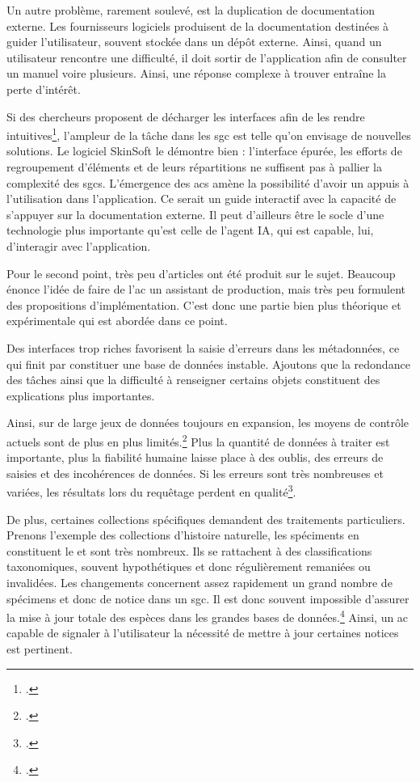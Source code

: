 Un autre problème, rarement soulevé, est la duplication de documentation externe. Les fournisseurs logiciels produisent de la documentation destinées à guider l'utilisateur, souvent stockée dans un dépôt externe. Ainsi, quand un utilisateur rencontre une difficulté, il doit sortir de l'application afin de consulter un manuel voire plusieurs. Ainsi, une réponse complexe à trouver entraîne la perte d'intérêt.
	
Si des chercheurs proposent de décharger les interfaces afin de les rendre intuitives\footcite{whitelawGenerousInterfacesDigital2015}, l'ampleur de la tâche dans les \gls{sgc} est telle qu'on envisage de nouvelles solutions. Le logiciel SkinSoft le démontre bien : l'interface épurée, les efforts de regroupement d'éléments et de leurs répartitions ne suffisent pas à pallier la complexité des \glspl{sgc}. L'émergence des \glspl{ac} amène la possibilité d'avoir un appuis à l'utilisation dans l'application. Ce serait un guide interactif avec la capacité de s'appuyer sur la documentation externe. Il peut d'ailleurs être le socle d'une technologie plus importante qu'est celle de l'agent IA, qui est capable, lui, d'interagir avec l'application.\newline
	
Pour le second point, très peu d'articles ont été produit sur le sujet. Beaucoup énonce l'idée de faire de l'\gls{ac} un assistant de production, mais très peu formulent des propositions d'implémentation. C'est donc une partie bien plus théorique et expérimentale qui est abordée dans ce point. 

Des interfaces trop riches favorisent la saisie d'erreurs dans les métadonnées, ce qui finit par constituer une base de données instable. Ajoutons que la redondance des tâches ainsi que la difficulté à renseigner certains objets constituent des explications plus importantes. 

Ainsi, sur de large jeux de données toujours en expansion, les moyens de contrôle actuels sont de plus en plus limités.\footcite[p.2]{lewisImpactHumanDecisionMaking2025} Plus la quantité de données à traiter est importante, plus la fiabilité humaine laisse place à des oublis, des erreurs de saisies et des incohérences de données. Si les erreurs sont très nombreuses et variées, les résultats lors du requêtage perdent en qualité\footcite[p.4]{lewisImpactHumanDecisionMaking2025}.
	
De plus, certaines collections spécifiques demandent des traitements particuliers. Prenons l'exemple des collections d'histoire naturelle, les spéciments en constituent le \coeur et sont très nombreux. Ils se rattachent à des classifications taxonomiques, souvent hypothétiques et donc régulièrement remaniées ou invalidées. Les changements concernent assez rapidement un grand nombre de spécimens et donc de notice dans un \gls{sgc}. Il est donc souvent impossible d'assurer la mise à jour totale des espèces dans les grandes bases de données.\footcite{hedrickDigitizationFutureNatural2020} Ainsi, un \gls{ac} capable de signaler à l'utilisateur la nécessité de mettre à jour certaines notices est pertinent.\newline
	
